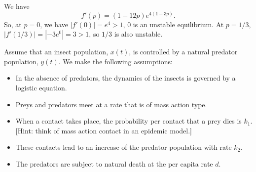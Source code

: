 \documentclass[12pt]{exam}
\begin{document}
\begin{questions}
\begin{parts}
\begin{solution}
We have
\[
f'(p)=(1-12p)e^{4(1-3p)}.
\]
So, at $p=0$, we have $|f'(0)|=e^4>1$, 0 is an unstable equilibrium. At $p=1/3$, $|f'(1/3)|=|-3e^0|=3>1$, so $1/3$ is also unstable.
\end{solution}
\end{parts}




\vskip0.5cm
\question[20]
Assume that an insect population, $x(t)$, is controlled by a natural predator population, $y(t)$. We make the following assumptions:
\begin{itemize}
\item In the absence of predators, the dynamics of the insects is governed by a logistic equation.
\item Preys and predators meet at a rate that is of mass action type.
\item When a contact takes place, the probability per contact that a prey dies is $k_1$. [Hint: think of mass action contact in an epidemic model.]
\item These contacts lead to an increase of the predator population with rate $k_2$.
\item The predators are subject to natural death at the per capita rate $d$.
\end{itemize}
\end{questions}
\end{document}
